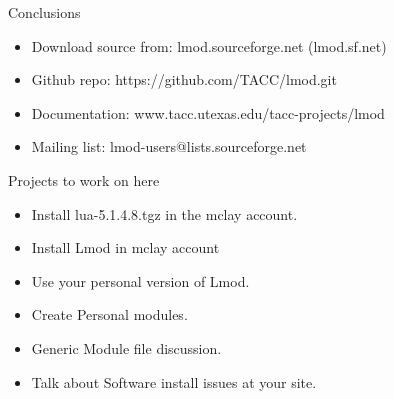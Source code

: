 \documentclass{beamer}
\begin{document}
\begin{frame}{Conclusions}
  \begin{itemize}
    \item Download source from: lmod.sourceforge.net (lmod.sf.net)
    \item Github repo: https://github.com/TACC/lmod.git
    \item Documentation: www.tacc.utexas.edu/tacc-projects/lmod
    \item Mailing list: lmod-users@lists.sourceforge.net
  \end{itemize}
\end{frame}


\begin{frame}{Projects to work on here}
  \begin{itemize}
    \item Install lua-5.1.4.8.tgz in the mclay account.
    \item Install Lmod in mclay account
    \item Use your personal version of Lmod.
    \item Create Personal modules.
    \item Generic Module file discussion.
    \item Talk about Software install issues at your site.
  \end{itemize}
\end{frame}
\end{document}
